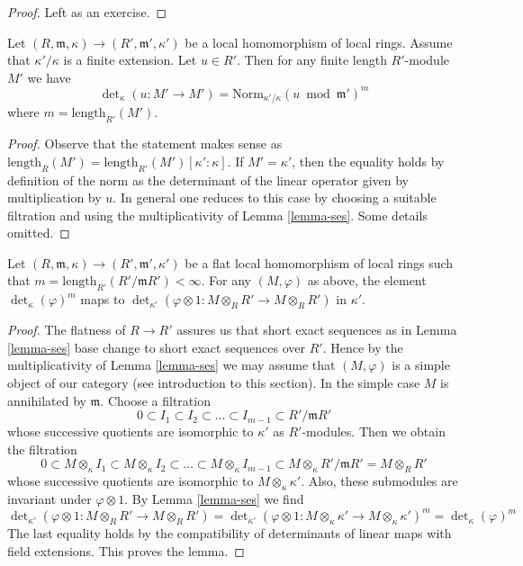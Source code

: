 \begin{proof}
Left as an exercise.
\end{proof}

\begin{lemma}
\label{lemma-multiplication}
Let $(R, \mathfrak m, \kappa) \to (R', \mathfrak m', \kappa')$
be a local homomorphism of local rings. Assume that $\kappa'/\kappa$
is a finite extension. Let $u \in R'$. Then for
any finite length $R'$-module $M'$ we have
$$
\det\nolimits_\kappa(u : M' \to M') =
\text{Norm}_{\kappa'/\kappa}(u \bmod \mathfrak m')^m
$$
where $m = \text{length}_{R'}(M')$.
\end{lemma}

\begin{proof}
Observe that the statement makes sense as
$\text{length}_R(M') = \text{length}_{R'}(M') [\kappa' : \kappa]$.
If $M' = \kappa'$, then the equality holds by definition of the
norm as the determinant of the linear operator given by multiplication
by $u$. In general one reduces to this case by choosing a suitable
filtration and using the multiplicativity of Lemma \ref{lemma-ses}.
Some details omitted.
\end{proof}

\begin{lemma}
\label{lemma-flat-base-change-det}
Let $(R, \mathfrak m, \kappa) \to (R', \mathfrak m', \kappa')$
be a flat local homomorphism of local rings such that
$m = \text{length}_{R'}(R'/\mathfrak mR') < \infty$.
For any $(M, \varphi)$ as above, the element
$\det_\kappa(\varphi)^m$ maps to
$\det_{\kappa'}(\varphi \otimes 1 : M \otimes_R R' \to M \otimes_R R')$
in $\kappa'$.
\end{lemma}

\begin{proof}
The flatness of $R \to R'$ assures us that short exact sequences
as in Lemma \ref{lemma-ses} base change to short exact sequences
over $R'$. Hence by the multiplicativity of Lemma \ref{lemma-ses}
we may assume that $(M, \varphi)$ is a simple object of our category
(see introduction to this section). In the simple case $M$ is annihilated
by $\mathfrak m$. Choose a filtration
$$
0 \subset I_1 \subset I_2 \subset \ldots \subset I_{m - 1} \subset
R'/\mathfrak mR'
$$
whose successive quotients are isomorphic to $\kappa'$ as $R'$-modules.
Then we obtain the filtration
$$
0 \subset
M \otimes_\kappa I_1 \subset
M \otimes_\kappa I_2 \subset
\ldots \subset
M \otimes_\kappa I_{m - 1} \subset
M \otimes_\kappa R'/\mathfrak mR' = M \otimes_R R'
$$
whose successive quotients are isomorphic to $M \otimes_\kappa \kappa'$.
Also, these submodules are invariant under $\varphi \otimes 1$.
By Lemma \ref{lemma-ses} we find
$$
\det\nolimits_{\kappa'}(\varphi \otimes 1 : M \otimes_R R' \to M \otimes_R R')
=
\det\nolimits_{\kappa'}(\varphi \otimes 1 :
M \otimes_\kappa \kappa' \to M \otimes_\kappa \kappa')^m =
\det\nolimits_\kappa(\varphi)^m
$$
The last equality holds by the compatibility of determinants
of linear maps with field extensions. This proves the lemma.
\end{proof}







